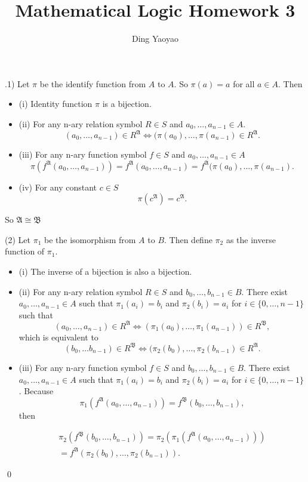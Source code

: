 \documentclass[10pt,a4paper]{article}
\author{Ding Yaoyao}
\title{Mathematical Logic Homework 3}
\newenvironment{sol}[1]
{\par\vspace{3mm}\noindent{\it Solution #1}.}
{\qed}
\newcommand{\fA}{\mathfrak{A}}
\newcommand{\fB}{\mathfrak{B}}
\begin{document}
	\maketitle
	
	\begin{sol}{2.1} %
		
		(1) Let $\pi$ be the identify function from $A$ to $A$. So $\pi(a) = a$ for all $a \in A$. Then 
		\begin{itemize}
			\item (i) Identity function $\pi$ is a bijection.
			\item (ii) For any n-ary relation symbol $R \in S$ and $a_0, \dots, a_{n-1}\in A$.
			$$(a_0,\dots,a_{n-1})\in R^{\fA} \Leftrightarrow (\pi(a_0), \dots, \pi(a_{n-1})\in R^{\fA}.$$
			\item (iii) For any n-ary function symbol $f \in S$ and $a_0,\dots,a_{n-1} \in A$ 
			$$\pi(f^{\fA}(a_0,\dots,a_{n-1})) = f^{\fA}(a_0,\dots,a_{n-1}) = f^{\fA}(\pi(a_0),\dots,\pi(a_{n-1}).$$
			\item (iv) For any constant $c \in S$
			$$ \pi(c^{\fA}) = c^{\fA}. $$
		\end{itemize}
		So $\fA \cong \fB$
		
		(2) Let $\pi_1$ be the isomorphism from $A$ to $B$. Then define $\pi_2$ as the inverse function of $\pi_1$.
		\begin{itemize}
			\item (i) The inverse of a bijection is also a bijection.
			\item (ii) For any n-ary relation symbol $R \in S$ and $b_0, \dots, b_{n-1}\in B$. There exist $a_0, \dots, a_{n-1} \in A$ such that $\pi_1(a_i) = b_i$ and $\pi_2(b_i) = a_i$ for $i \in \{0, \dots, n-1\}$ such that
			$$
				(a_0, \dots, a_{n-1}) \in R^{\fA} \Leftrightarrow (\pi_1(a_0),\dots, \pi_1(a_{n-1})) \in R^{\fB},
			$$which is equivalent to
			$$
				(b_0, \dots b_{n-1}) \in R^{\fB} \Leftrightarrow (\pi_2(b_0),\dots,\pi_2(b_{n-1}) \in R^{\fA}.
			$$
			\item (iii) For any n-ary function symbol $f \in S$ and $b_0, \dots, b_{n-1}\in B$. There exist $a_0, \dots, a_{n-1} \in A$ such that $\pi_1(a_i) = b_i$ and $\pi_2(b_i) = a_i$ for $i \in \{0, \dots, n-1\}$. Because 
			$$
			\pi_1(f^{\fA}(a_0,\dots,a_{n-1})) = f^{\fB}(b_0,\dots,b_{n-1}),
			$$
			then
			
			\begin{align*}
				\pi_2(f^{\fB}(b_0,\dots,b_{n-1})) = \pi_2(\pi_1(f^{\fA}(a_0,\dots,a_{n-1}))) \\
				= f^{\fA}(\pi_2(b_0),\dots,\pi_2(b_{n-1})).
			\end{align*}


\end{itemize}
\end{sol}
\end{document}
